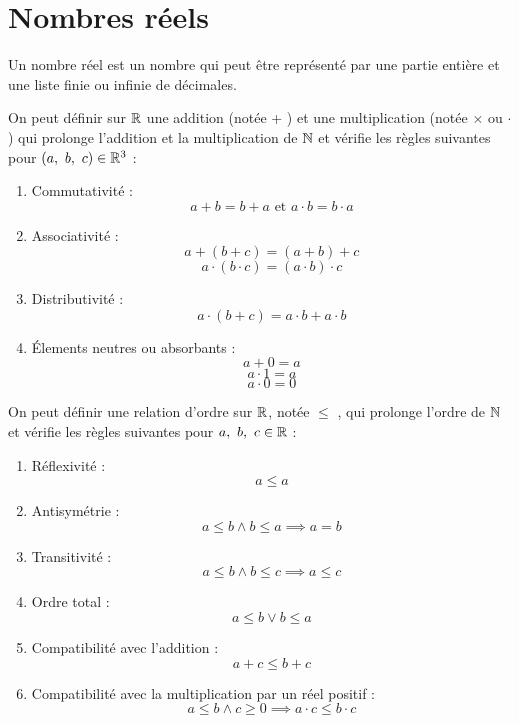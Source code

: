 \chapter{Nombres réels}\label{chap:nb_reels}
\def\arraystretch{1}

\begin{definition}
    Un nombre réel est un nombre qui peut être représenté par une partie entière et une liste finie ou infinie de décimales.
\end{definition}

\begin{proposition}
    On peut définir sur $\mathbb{R}$ une addition (notée \og + \fg) et une multiplication (notée \og $\times$ \fg ou \og $\cdot$ \fg) qui prolonge l'addition et la multiplication de $\mathbb{N}$ et vérifie les règles suivantes pour $(a,\ b,\ c) \in \mathbb{R}^3$ :
    \begin{enumerate}
        \item Commutativité : 
        \[ a + b = b + a \text{ et } a \cdot b = b \cdot a \]
        \item Associativité : 
        \[ a + (b + c) = (a + b) + c \]
        \[ a \cdot (b \cdot c) = (a \cdot b) \cdot c \]
        \item Distributivité : 
        \[ a \cdot (b + c) = a \cdot b + a \cdot b \]
        \item \'Elements neutres ou absorbants :
        \[ a + 0 = a \]
        \[ a \cdot 1 = a \]
        \[a \cdot 0 = 0 \]
    \end{enumerate}
\end{proposition}

\begin{proposition}
    On peut définir une relation d'ordre sur $\mathbb{R}$, notée \og $\leq$ \fg, qui prolonge l'ordre de $\mathbb{N}$ et vérifie les règles suivantes pour $a,\ b,\ c \in \mathbb{R}$ :
    \begin{enumerate}
        \item Réflexivité : 
        \[ a \leq a \]
        \item Antisymétrie : 
        \[ a \leq b \land b \leq a \implies a = b \]
        \item Transitivité : 
        \[ a \leq b \land b \leq c \implies a \leq c \]
        \item Ordre total : 
        \[ a \leq b \lor b \leq a \]
        \item Compatibilité avec l'addition :
        \[ a + c \leq b + c \]
        \item Compatibilité avec la multiplication par un réel positif :
        \[ a \leq b \land c \geq 0 \implies a \cdot c \leq b \cdot c \]
    \end{enumerate}
\end{proposition}

